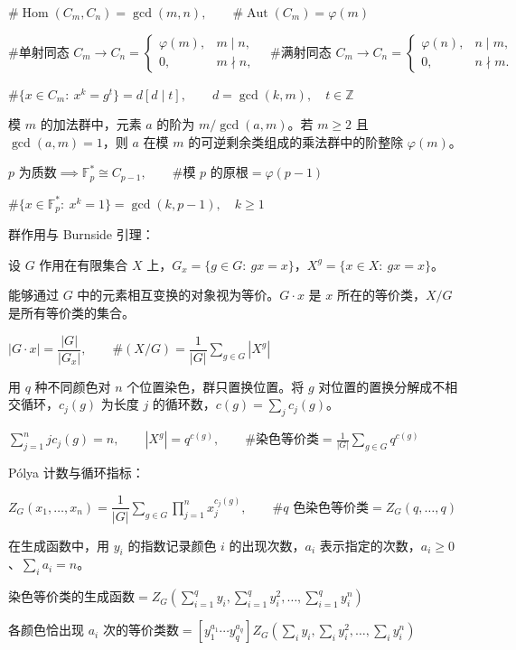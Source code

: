$\#\operatorname{Hom}(C_m,C_n)=\gcd(m,n),\qquad\#\operatorname{Aut}(C_m)=\varphi(m)$

$\#\text{单射同态 }C_m\to C_n=\begin{cases}\varphi(m),&m\mid n,\\0,&m\nmid n,\end{cases}\quad\#\text{满射同态 }C_m\to C_n=\begin{cases}\varphi(n),&n\mid m,\\0,&n\nmid m.\end{cases}$

$\#\{x\in C_m:\ x^k=g^t\}=d[d\mid t],\qquad d=\gcd(k,m),\quad t\in\mathbb Z$

模 $m$ 的加法群中，元素 $a$ 的阶为 $m/\gcd(a,m)$。若 $m\ge2$ 且 $\gcd(a,m)=1$，则 $a$ 在模 $m$ 的可逆剩余类组成的乘法群中的阶整除 $\varphi(m)$。

$p\text{ 为质数}\implies\mathbb F_p^*\cong C_{p-1},\qquad\#\text{模 $p$ 的原根}=\varphi(p-1)$

$\#\{x\in\mathbb F_p^*:\ x^k=1\}=\gcd(k,p-1),\quad k\ge1$

群作用与 Burnside 引理：\nopagebreak[4]

设 $G$ 作用在有限集合 $X$ 上，$G_x=\{g\in G:\ gx=x\}$，$X^g=\{x\in X:\ gx=x\}$。\nopagebreak[4]

能够通过 $G$ 中的元素相互变换的对象视为等价。$G\cdot x$ 是 $x$ 所在的等价类，$X/G$ 是所有等价类的集合。\nopagebreak[4]

$|G\cdot x|=\dfrac{|G|}{|G_x|},\qquad\#(X/G)=\dfrac1{|G|}\displaystyle\sum_{g\in G}|X^g|$

用 $q$ 种不同颜色对 $n$ 个位置染色，群只置换位置。将 $g$ 对位置的置换分解成不相交循环，$c_j(g)$ 为长度 $j$ 的循环数，$c(g)=\sum_jc_j(g)$。\nopagebreak[4]

$\displaystyle\sum_{j=1}^{n}jc_j(g)=n,\qquad|X^g|=q^{c(g)},\qquad\#\text{染色等价类}=\frac1{|G|}\sum_{g\in G}q^{c(g)}$

P\'olya 计数与循环指标：\nopagebreak[4]

$Z_G(x_1,\dots,x_n)=\dfrac1{|G|}\displaystyle\sum_{g\in G}\prod_{j=1}^{n}x_j^{c_j(g)},\qquad\#\text{$q$ 色染色等价类}=Z_G(q,\dots,q)$

在生成函数中，用 $y_i$ 的指数记录颜色 $i$ 的出现次数，$a_i$ 表示指定的次数，$a_i\ge0$、$\sum_i a_i=n$。\nopagebreak[4]

$\text{染色等价类的生成函数}=Z_G\left(\sum_{i=1}^{q}y_i,\sum_{i=1}^{q}y_i^2,\dots,\sum_{i=1}^{q}y_i^n\right)$

$\text{各颜色恰出现 $a_i$ 次的等价类数}=[y_1^{a_1}\cdots y_q^{a_q}]Z_G\left(\sum_i y_i,\sum_i y_i^2,\dots,\sum_i y_i^n\right)$

